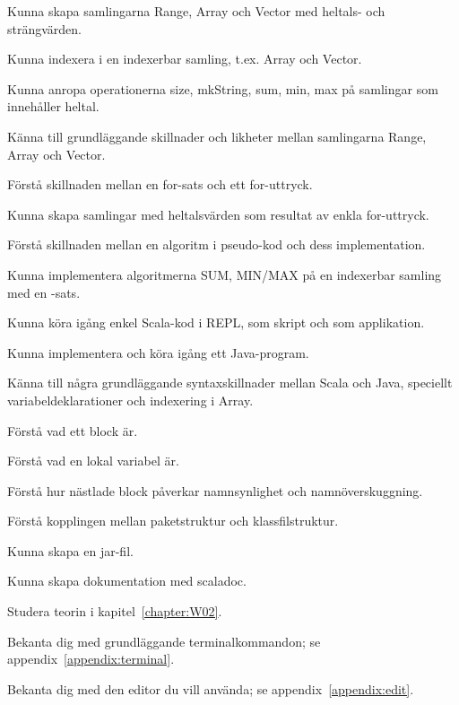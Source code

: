 
\Exercise{\ExeWeekTWO}

\begin{Goals}
\item Kunna skapa samlingarna Range, Array och Vector med heltals- och strängvärden.
\item Kunna indexera i en indexerbar samling, t.ex. Array och Vector.
\item Kunna anropa operationerna size, mkString, sum, min, max på samlingar som innehåller heltal.
\item Känna till grundläggande skillnader och likheter mellan samlingarna Range, Array och Vector.
\item Förstå skillnaden mellan en for-sats och ett for-uttryck.
\item Kunna skapa samlingar med heltalsvärden som resultat av enkla for-uttryck.
\item Förstå skillnaden mellan en algoritm i pseudo-kod och dess implementation.
\item Kunna implementera algoritmerna SUM, MIN/MAX på en indexerbar samling med en -sats.
\item Kunna köra igång enkel Scala-kod i REPL, som skript och som applikation.
\item Kunna implementera och köra igång ett Java-program. 
\item Känna till några grundläggande syntaxskillnader mellan Scala och Java, speciellt variabeldeklarationer och indexering i Array. 
\item Förstå vad ett block är.
\item Förstå vad en lokal variabel är.
\item Förstå hur nästlade block påverkar namnsynlighet och namnöverskuggning.
\item Förstå kopplingen mellan paketstruktur och klassfilstruktur.
\item Kunna skapa en jar-fil.
\item Kunna skapa dokumentation med scaladoc.
\end{Goals}

\begin{Preparations}
\item Studera teorin i kapitel~\ref{chapter:W02}.
\item Bekanta dig med grundläggande terminalkommandon; se appendix~\ref{appendix:terminal}. 
\item Bekanta dig med den editor du vill använda; se appendix~\ref{appendix:edit}.
\end{Preparations}

